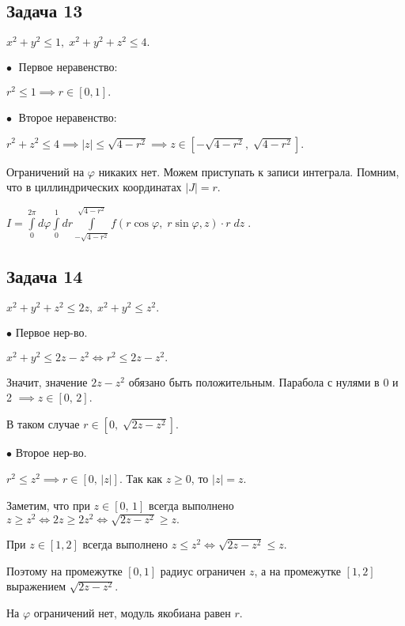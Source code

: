 \documentclass[a4paper, fleqn]{article}
\begin{document}
    \subsection*{Задача 13}
    
    $x^2 + y^2 \leq 1, \; x^2 + y^2 + z^2 \leq 4.$
    
    $\bullet \; $ Первое неравенство:
    
    $r^2 \leq 1 \implies r \in [0,1].$
    
    $\bullet \; $ Второе неравенство:
    
    $r^2 + z^2 \leq 4 \implies |z| \leq \sqrt{4 - r^2} \implies z \in [-\sqrt{4 - r^2}, \; \sqrt{4 - r^2}].$
    
    Ограничений на  $\varphi$ никаких нет. Можем приступать к записи интеграла. Помним, что в циллиндрических координатах $|J| = r.$
    
    $I = \boxed{\displaystyle \int\limits_{0}^{2 \pi} d \varphi \int\limits_{0}^{1} dr \int\limits_{-\sqrt{4 - r^2}}^{\sqrt{4 - r^2}} f(r \cos \varphi, \; r \sin \varphi, z) \cdot r \; dz} \; .$
    
     
    \subsection*{Задача 14}
    
    $x^2 + y^2 + z^2 \leq  2z, \; x^2 + y^2 \leq z^2.$
    
    $\bullet$ Первое нер-во.
    
    $x^2 + y^2 \leq 2z - z^2 \iff r^2 \leq 2z-z^2.$ 
    
    Значит, значение $2z - z^2$ обязано быть положительным. Парабола с нулями в 0 и 2 $\implies z \in [0, \, 2].$
    
    В таком случае $r \in \left[0, \; \sqrt{2z - z^2} \right].$
    
    $\bullet$ Второе нер-во.
    
    $r^2 \leq z^2 \implies r \in \left[0, \, |z|\right].$ Так как $z \geq 0$, то $|z| = z.$ 
    
    Заметим, что при $z \in [0, \, 1]$ всегда выполнено $z \geq z^2 \iff 2z \geq 2z^2 \iff \sqrt{2z - z^2} \geq z .$
    
    При $z \in [1, 2]$ всегда выполнено $z \leq z^2 \iff \sqrt{2z - z^2} \leq z.$
    
    Поэтому на промежутке $[0,1]$ радиус ограничен $z$, а на промежутке $[1,2]$ выражением $\sqrt{2z - z^2}$.
    
    На $\varphi$ ограничений нет, модуль якобиана равен $r$.
    
\end{document}

